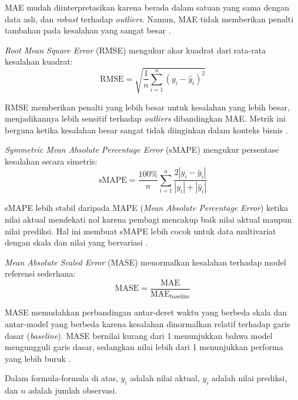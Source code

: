 MAE mudah diinterpretasikan karena berada dalam satuan yang sama dengan data asli, dan \textit{robust} terhadap \textit{outliers}. Namun, MAE tidak memberikan penalti tambahan pada kesalahan yang sangat besar \autocite{Petropoulos2023ForecastEval}.

\textit{Root Mean Square Error} (RMSE)\label{sym:RMSE} mengukur akar kuadrat dari rata-rata kesalahan kuadrat:
\begin{equation}
\text{RMSE} = \sqrt{\frac{1}{n} \sum_{i=1}^n (y_i - \hat{y}_i)^2}
\end{equation}

RMSE memberikan penalti yang lebih besar untuk kesalahan yang lebih besar, menjadikannya lebih sensitif terhadap \textit{outliers} dibandingkan MAE. Metrik ini berguna ketika kesalahan besar sangat tidak diinginkan dalam konteks bisnis \autocite{Petropoulos2023ForecastEval}.

\textit{Symmetric Mean Absolute Percentage Error} (sMAPE)\label{sym:sMAPE} mengukur persentase kesalahan secara simetris:
\begin{equation}
\text{sMAPE} = \frac{100\%}{n} \sum_{i=1}^n \frac{2|y_i - \hat{y}_i|}{|y_i| + |\hat{y}_i|}
\end{equation}

sMAPE lebih stabil daripada MAPE\label{sym:MAPE}\label{abbr:MAPE} (\textit{Mean Absolute Percentage Error}) ketika nilai aktual mendekati nol karena pembagi mencakup baik nilai aktual maupun nilai prediksi. Hal ini membuat sMAPE lebih cocok untuk data multivariat dengan skala dan nilai yang bervariasi \autocite{Petropoulos2023ForecastEval}.

\textit{Mean Absolute Scaled Error} (MASE)\label{sym:MASE} menormalkan kesalahan terhadap model referensi sederhana:
\begin{equation}
\text{MASE} = \frac{\text{MAE}}{\text{MAE}_{\text{baseline}}}
\end{equation}

MASE memudahkan perbandingan antar-deret waktu yang berbeda skala dan antar-model yang berbeda karena kesalahan dinormalkan relatif terhadap garis dasar (\textit{baseline}). MASE bernilai kurang dari 1 menunjukkan bahwa model mengungguli garis dasar, sedangkan nilai lebih dari 1 menunjukkan performa yang lebih buruk \autocite{Petropoulos2023ForecastEval}.

Dalam formula-formula di atas, \(y_i\) adalah nilai aktual, \(\hat{y}_i\) adalah nilai prediksi, dan \(n\) adalah jumlah observasi.

